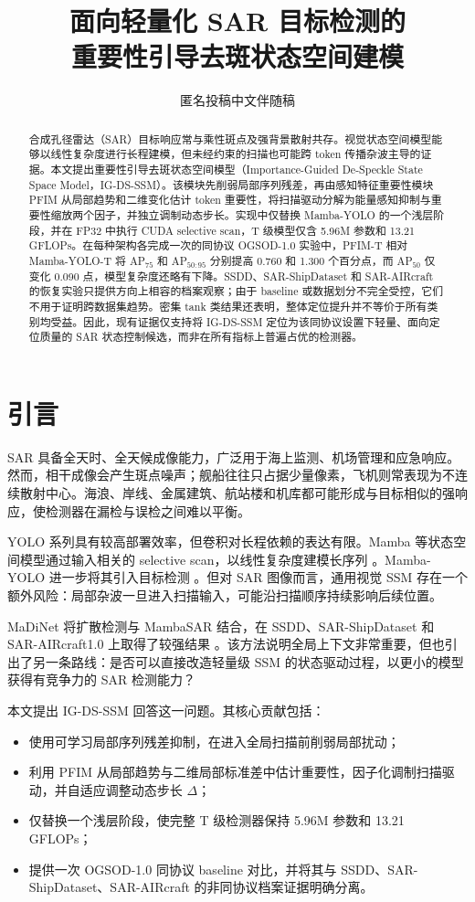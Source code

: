 \documentclass[10pt,twocolumn]{ctexart}
\title{面向轻量化 SAR 目标检测的\\重要性引导去斑状态空间建模}
\author{匿名投稿\quad 中文伴随稿}
\date{}
\newcommand{\method}{IG-DS-SSM}
\newcommand{\apfifty}{AP$_{50}$}
\newcommand{\apcoco}{AP$_{50:95}$}
\begin{document}
\maketitle

\begin{abstract}
合成孔径雷达（SAR）目标响应常与乘性斑点及强背景散射共存。视觉状态空间模型能够以线性复杂度进行长程建模，但未经约束的扫描也可能跨 token 传播杂波主导的证据。本文提出重要性引导去斑状态空间模型（Importance-Guided De-Speckle State Space Model，\method）。该模块先削弱局部序列残差，再由感知特征重要性模块 PFIM 从局部趋势和二维变化估计 token 重要性，将扫描驱动分解为能量感知抑制与重要性缩放两个因子，并独立调制动态步长。实现中仅替换 Mamba-YOLO 的一个浅层阶段，并在 FP32 中执行 CUDA selective scan，T 级模型仅含 5.96M 参数和 13.21 GFLOPs。在每种架构各完成一次的同协议 OGSOD-1.0 实验中，PFIM-T 相对 Mamba-YOLO-T 将 AP$_{75}$ 和 \apcoco{} 分别提高 0.760 和 1.300 个百分点，而 \apfifty{} 仅变化 0.090 点，模型复杂度还略有下降。SSDD、SAR-ShipDataset 和 SAR-AIRcraft 的恢复实验只提供方向上相容的档案观察；由于 baseline 或数据划分不完全受控，它们不用于证明跨数据集趋势。密集 tank 类结果还表明，整体定位提升并不等价于所有类别均受益。因此，现有证据仅支持将 \method{} 定位为该同协议设置下轻量、面向定位质量的 SAR 状态控制候选，而非在所有指标上普遍占优的检测器。
\end{abstract}

\section{引言}

SAR 具备全天时、全天候成像能力，广泛用于海上监测、机场管理和应急响应。然而，相干成像会产生斑点噪声；舰船往往只占据少量像素，飞机则常表现为不连续散射中心。海浪、岸线、金属建筑、航站楼和机库都可能形成与目标相似的强响应，使检测器在漏检与误检之间难以平衡。

YOLO 系列具有较高部署效率，但卷积对长程依赖的表达有限。Mamba 等状态空间模型通过输入相关的 selective scan，以线性复杂度建模长序列 \citep{mamba,s4}。Mamba-YOLO 进一步将其引入目标检测 \citep{mambayolo}。但对 SAR 图像而言，通用视觉 SSM 存在一个额外风险：局部杂波一旦进入扫描输入，可能沿扫描顺序持续影响后续位置。

MaDiNet 将扩散检测与 MambaSAR 结合，在 SSDD、SAR-ShipDataset 和 SAR-AIRcraft1.0 上取得了较强结果 \citep{madinet}。该方法说明全局上下文非常重要，但也引出了另一条路线：是否可以直接改造轻量级 SSM 的状态驱动过程，以更小的模型获得有竞争力的 SAR 检测能力？

本文提出 \method{} 回答这一问题。其核心贡献包括：
\begin{itemize}
  \item 使用可学习局部序列残差抑制，在进入全局扫描前削弱局部扰动；
  \item 利用 PFIM 从局部趋势与二维局部标准差中估计重要性，因子化调制扫描驱动，并自适应调整动态步长 $\Delta$；
  \item 仅替换一个浅层阶段，使完整 T 级检测器保持 5.96M 参数和 13.21 GFLOPs；
  \item 提供一次 OGSOD-1.0 同协议 baseline 对比，并将其与 SSDD、SAR-ShipDataset、SAR-AIRcraft 的非同协议档案证据明确分离。
\end{itemize}
\end{document}
